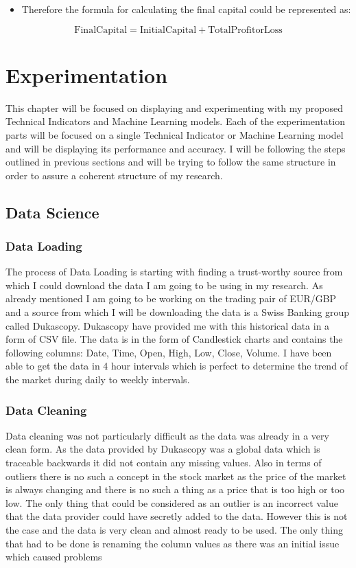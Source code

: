\documentclass{imc-inf}
\begin{document}
			\begin{itemize}
				\item Therefore the formula for calculating the final capital could be represented as:
			\end{itemize}
			\begin{equation}
				\mathrm{Final Capital} = \mathrm{Initial Capital} + \mathrm{Total Profit or Loss}
			\end{equation}
			

\chapter{Experimentation}
	This chapter will be focused on displaying and experimenting with my proposed Technical Indicators and Machine Learning models. Each of the experimentation 
	parts will be focused on a single Technical Indicator or Machine Learning model and will be displaying its performance and accuracy. I will be following the 
	steps outlined in previous sections and will be trying to follow the same structure in order to assure a coherent structure of my research. 

	\section{Data Science}
		\subsection{Data Loading}
			The process of Data Loading is starting with finding a trust-worthy source from which I could download the data I am going to be using in my 
			research. As already mentioned  I am going to be working on the trading pair of EUR/GBP and a source from which I will be downloading the data 
			is a Swiss Banking group called Dukascopy. Dukascopy have provided me with this historical data in a form of CSV file. The data is in the form of
			Candlestick charts and contains the following columns: Date, Time, Open, High, Low, Close, Volume. I have been able to get the data in 4 hour intervals
			which is perfect to determine the trend of the market during daily to weekly intervals. 
		\subsection{Data Cleaning}
			Data cleaning was not particularly difficult as the data was already in a very clean form. As the data provided by Dukascopy was a global data which is 
			traceable backwards it did not contain any missing values. Also in terms of outliers there is no such a concept in the stock market as the price of the 
			market is always changing and there is no such a thing as a price that is too high or too low. The only thing that could be considered as an outlier is 
			an incorrect value that the data provider could have secretly added to the data. However this is not the case and the data is very clean and almost ready to be used.
			The only thing that had to be done is renaming the column values as there was an initial issue which caused problems
\end{document}
